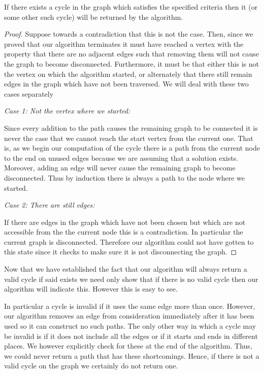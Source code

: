 \documentclass{article}
\begin{document}
If there exists a cycle in the graph which satisfies the specified criteria then it (or some other such cycle) will be returned by the algorithm. 
\begin{proof}
Suppose towards a contradiction that this is not the case. Then, since we proved that our algorithm terminates it must have reached a vertex with the property that there are no adjacent edges such that removing them will not cause the graph to become disconnected. Furthermore, it must be that either this is not the vertex on which the algorithm started, or alternately that there still remain edges in the graph which have not been traversed. We will deal with these two cases separately

\emph{Case 1: Not the vertex where we started: } 

Since every addition to the path causes the remaining graph to be connected it is never the case that  we cannot reach the start vertex from the current one. That is, as we begin our computation of the cycle there is a path from the current node to the end on unused edges because we are assuming that a solution exists. Moreover, adding an edge will never cause the remaining graph to become disconnected. Thus by induction there is always a path to the node where we started.

\emph{Case 2: There are still edges: }

If there are edges in the graph which have not been chosen but which are not accessible from the the current node this is a contradiction. In particular the current graph is disconnected. Therefore our algorithm could not have gotten to this state since it checks to make sure it is not disconnecting the graph. 
\end{proof}

Now that we have established the fact that our algorithm will always return a valid cycle if said exists we need only show that if there is no valid cycle then our algorithm will indicate this. However this is easy to see.

 In particular a cycle is invalid if it uses the same edge more than once. However, our algorithm removes an edge from consideration immediately after it has been used so it can construct no such paths. The only other way in which a cycle may be invalid is if it does not include all the edges or if it starts and ends in different places. We however explicitly check for these at the end of the algorithm. Thus, we could never return a path that has these shortcomings. Hence, if there is not a valid cycle on the graph we certainly do not return one.
\end{document}

